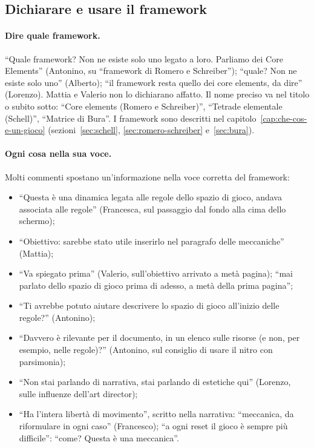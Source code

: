 \subsection{Dichiarare e usare il framework}
\label{rv:t1:sec:framework}

\paragraph{Dire quale framework.} ``Quale framework? Non ne esiste solo uno
legato a loro. Parliamo dei Core Elements'' (Antonino, su ``framework di
Romero e Schreiber''); ``quale? Non ne esiste solo uno'' (Alberto); ``il
framework resta quello dei core elements, da dire'' (Lorenzo). Mattia e
Valerio non lo dichiarano affatto. Il nome preciso va nel titolo o subito
sotto: ``Core elements (Romero e Schreiber)'', ``Tetrade elementale
(Schell)'', ``Matrice di Bura''. I framework sono descritti nel
capitolo~\ref{cap:che-cos-e-un-gioco} (sezioni~\ref{sec:schell},
\ref{sec:romero-schreiber} e~\ref{sec:bura}).

\paragraph{Ogni cosa nella sua voce.} Molti commenti spostano
un'informazione nella voce corretta del framework:
\begin{itemize}
  \item ``Questa è una dinamica legata alle regole dello spazio di gioco,
        andava associata alle regole'' (Francesca, sul passaggio dal fondo
        alla cima dello schermo);
  \item ``Obiettivo: sarebbe stato utile inserirlo nel paragrafo delle
        meccaniche'' (Mattia);
  \item ``Va spiegato prima'' (Valerio, sull'obiettivo arrivato a metà
        pagina); ``mai parlato dello spazio di gioco prima di adesso, a metà
        della prima pagina'';
  \item ``Ti avrebbe potuto aiutare descrivere lo spazio di gioco all'inizio
        delle regole?'' (Antonino);
  \item ``Davvero è rilevante per il documento, in un elenco sulle risorse
        (e non, per esempio, nelle regole)?'' (Antonino, sul consiglio di
        usare il nitro con parsimonia);
  \item ``Non stai parlando di narrativa, stai parlando di estetiche qui''
        (Lorenzo, sulle influenze dell'art director);
  \item ``Ha l'intera libertà di movimento'', scritto nella narrativa:
        ``meccanica, da riformulare in ogni caso'' (Francesco); ``a ogni
        reset il gioco è sempre più difficile'': ``come? Questa è una
        meccanica''.
\end{itemize}

